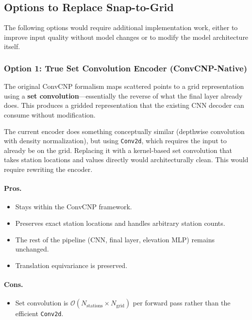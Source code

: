\subsection{Options to Replace Snap-to-Grid}

The following options would require additional implementation work, either to improve input quality without model changes or to modify the model architecture itself.

\subsubsection{Option 1: True Set Convolution Encoder (ConvCNP-Native)}

The original ConvCNP formalism \citep{gordon2019} maps scattered points to a grid representation using a \textbf{set convolution}---essentially the reverse of what the final layer already does. This produces a gridded representation that the existing CNN decoder can consume without modification.

The current encoder does something conceptually similar (depthwise convolution with density normalization), but using \texttt{Conv2d}, which requires the input to already be on the grid. Replacing it with a kernel-based set convolution that takes station locations and values directly would architecturally clean. This would require rewriting the encoder.

\paragraph{Pros.}
\begin{itemize}
    \item Stays within the ConvCNP framework.
    \item Preserves exact station locations and handles arbitrary station counts.
    \item The rest of the pipeline (CNN, final layer, elevation MLP) remains unchanged.
    \item Translation equivariance is preserved.
\end{itemize}

\paragraph{Cons.}
\begin{itemize}
    \item Set convolution is $\mathcal{O}(N_{\text{stations}} \times N_{\text{grid}})$ per forward pass rather than the efficient \texttt{Conv2d}.
\end{itemize}


